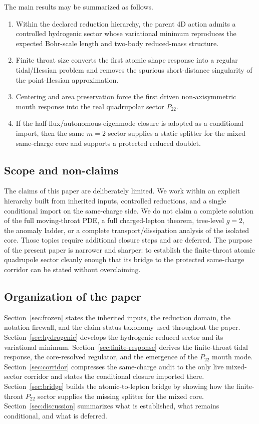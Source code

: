 \documentclass[11pt]{article}
\theoremstyle{plain}
\theoremstyle{definition}
\theoremstyle{remark}
\newcommand{\Ptwotwo}{P_{22}}
\begin{document}
The main results may be summarized as follows.
\begin{enumerate}
  \item Within the declared reduction hierarchy, the parent 4D action admits a controlled hydrogenic sector whose variational minimum reproduces the expected Bohr-scale length and two-body reduced-mass structure.
  \item Finite throat size converts the first atomic shape response into a regular tidal/Hessian problem and removes the spurious short-distance singularity of the point-Hessian approximation.
  \item Centering and area preservation force the first driven non-axisymmetric mouth response into the real quadrupolar sector \(\Ptwotwo\).
  \item If the half-flux/autonomous-eigenmode closure is adopted as a conditional import, then the same \(m=2\) sector supplies a static splitter for the mixed same-charge core and supports a protected reduced doublet.
\end{enumerate}

\subsection{Scope and non-claims}\label{subsec:intro-boundary}

The claims of this paper are deliberately limited. We work within an explicit hierarchy built from inherited inputs, controlled reductions, and a single conditional import on the same-charge side. We do not claim a complete solution of the full moving-throat PDE, a full charged-lepton theorem, tree-level \(g=2\), the anomaly ladder, or a complete transport/dissipation analysis of the isolated core. Those topics require additional closure steps and are deferred. The purpose of the present paper is narrower and sharper: to establish the finite-throat atomic quadrupole sector cleanly enough that its bridge to the protected same-charge corridor can be stated without overclaiming.

\subsection{Organization of the paper}\label{subsec:intro-roadmap}

Section~\ref{sec:frozen} states the inherited inputs, the reduction domain, the notation firewall, and the claim-status taxonomy used throughout the paper. Section~\ref{sec:hydrogenic} develops the hydrogenic reduced sector and its variational minimum. Section~\ref{sec:finite-response} derives the finite-throat tidal response, the core-resolved regulator, and the emergence of the \(\Ptwotwo\) mouth mode. Section~\ref{sec:corridor} compresses the same-charge audit to the only live mixed-sector corridor and states the conditional closure imported there. Section~\ref{sec:bridge} builds the atomic-to-lepton bridge by showing how the finite-throat \(\Ptwotwo\) sector supplies the missing splitter for the mixed core. Section~\ref{sec:discussion} summarizes what is established, what remains conditional, and what is deferred.
\end{document}
